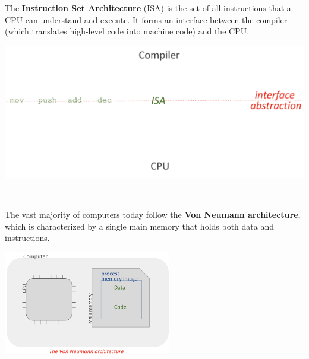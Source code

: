 \documentclass[../../compsys.tex]{subfiles}
\begin{document}
\begin{minipage}{0.45\textwidth}
\begin{definition}[ISA]
The \textbf{Instruction Set Architecture} (ISA) is the set of all instructions that a CPU can understand and execute. It forms an interface between the compiler (which translates high-level code into machine code) and the CPU.
\end{definition}
\end{minipage}
\hfill
\vline
\hfill
\begin{minipage}{0.45\textwidth}
\begin{center}
  \includegraphics[width=1.25\textwidth]{chapters/L1/images/isa.png}
\end{center}
\end{minipage}\\
\vfill
\begin{definition}
The vast majority of computers today follow the \textbf{Von Neumann architecture}, which is characterized by a single main memory that holds both data and instructions.

\begin{center}
  \includegraphics[width=0.55\textwidth]{chapters/L1/images/von.png}
\end{center}
\end{definition}
\end{document}
